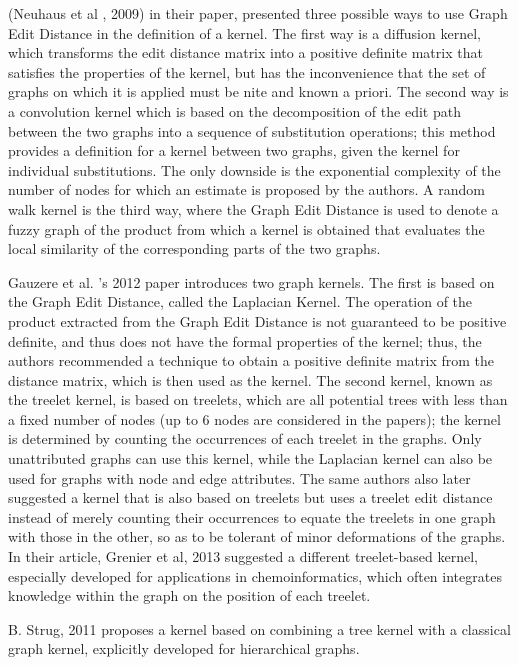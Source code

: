 (Neuhaus et al , 2009) in their paper,  presented three possible ways to use Graph Edit Distance in the definition of a kernel. The first way is a diffusion kernel, which transforms the edit distance matrix into a positive definite matrix that satisfies the properties of the kernel, but has the inconvenience that the set of graphs on which it is applied must be nite and known a priori. The second way is a convolution kernel which is based on the decomposition of the edit path between the two graphs into a sequence of substitution operations; this method provides a definition for a kernel between two graphs, given the kernel for individual substitutions. The only downside is the exponential complexity of the number of nodes for which an estimate is proposed by the authors. A random walk kernel is the third way, where the Graph Edit Distance is used to denote a fuzzy graph of the product from which a kernel is obtained that evaluates the local similarity of the corresponding parts of the two graphs.

Gauzere et al. 's 2012 paper introduces two graph kernels. The first is based on the Graph Edit Distance, called the Laplacian Kernel. The operation of the product extracted from the Graph Edit Distance is not guaranteed to be positive definite, and thus does not have the formal properties of the kernel; thus, the authors recommended a technique to obtain a positive definite matrix from the distance matrix, which is then used as the kernel. The second kernel, known as the treelet kernel, is based on treelets, which are all potential trees with less than a fixed number of nodes (up to 6 nodes are considered in the papers); the kernel is determined by counting the occurrences of each treelet in the graphs. Only unattributed graphs can use this kernel, while the Laplacian kernel can also be used for graphs with node and edge attributes. The same authors also later suggested a kernel that is also based on treelets but uses a treelet edit distance instead of merely counting their occurrences to equate the treelets in one graph with those in the other, so as to be tolerant of minor deformations of the graphs. In their article, Grenier et al, 2013 suggested a different treelet-based kernel, especially developed for applications in chemoinformatics, which often integrates knowledge within the graph on the position of each treelet. 

B. Strug, 2011 proposes a kernel based on combining a tree kernel with a classical graph kernel, explicitly developed for hierarchical graphs.